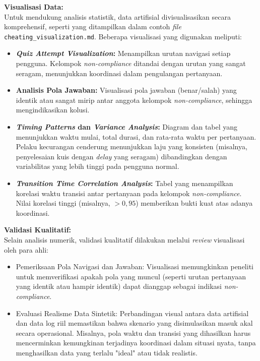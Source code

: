 \textbf{Visualisasi Data:} \\
Untuk mendukung analisis statistik, data artifisial divisualisasikan secara komprehensif, seperti yang ditampilkan dalam contoh \textit{file} \texttt{cheating\_visualization.md}. Beberapa visualisasi yang digunakan meliputi:
\begin{itemize}
    \item \textbf{\textit{Quiz Attempt Visualization}:} Menampilkan urutan navigasi setiap pengguna. Kelompok \textit{non-compliance} ditandai dengan urutan yang sangat seragam, menunjukkan koordinasi dalam pengulangan pertanyaan.
    \item \textbf{Analisis Pola Jawaban:} Visualisasi pola jawaban (benar/salah) yang identik atau sangat mirip antar anggota kelompok \textit{non-compliance}, sehingga mengindikasikan kolusi.
    \item \textbf{\textit{Timing Patterns} dan \textit{Variance Analysis}:} Diagram dan tabel yang menunjukkan waktu mulai, total durasi, dan rata-rata waktu per pertanyaan. Pelaku kecurangan cenderung menunjukkan laju yang konsisten (misalnya, penyelesaian kuis dengan \textit{delay} yang seragam) dibandingkan dengan variabilitas yang lebih tinggi pada pengguna normal.
    \item \textbf{\textit{Transition Time Correlation Analysis}:} Tabel yang menampilkan korelasi waktu transisi antar pertanyaan pada kelompok \textit{non-compliance}. Nilai korelasi tinggi (misalnya, $> 0,95$) memberikan bukti kuat atas adanya koordinasi.
\end{itemize}

\textbf{Validasi Kualitatif:} \\
Selain analisis numerik, validasi kualitatif dilakukan melalui \textit{review} visualisasi oleh para ahli:
\begin{itemize}
    \item Pemeriksaan Pola Navigasi dan Jawaban: Visualisasi memungkinkan peneliti untuk memverifikasi apakah pola yang muncul (seperti urutan pertanyaan yang identik atau hampir identik) dapat dianggap sebagai indikasi \textit{non-compliance}.
    \item Evaluasi Realisme Data Sintetik: Perbandingan visual antara data artifisial dan data log riil memastikan bahwa skenario yang disimulasikan masuk akal secara operasional. Misalnya, pola waktu dan transisi yang dihasilkan harus mencerminkan kemungkinan terjadinya koordinasi dalam situasi nyata, tanpa menghasilkan data yang terlalu "ideal" atau tidak realistis.
\end{itemize}


